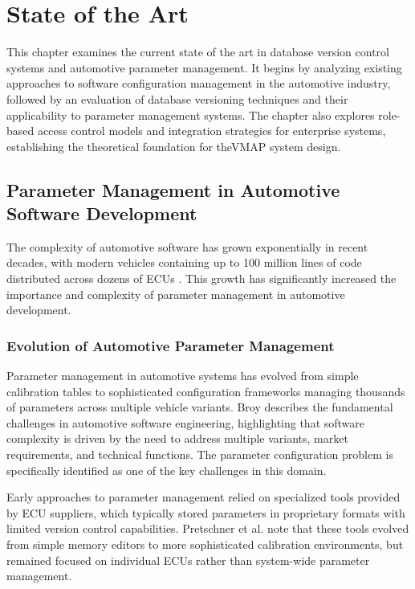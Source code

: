 \chapter{State of the Art}
\label{chap:state-of-art}

This chapter examines the current state of the art in database version control systems and automotive parameter management. It begins by analyzing existing approaches to software configuration management in the automotive industry, followed by an evaluation of database versioning techniques and their applicability to parameter management systems. The chapter also explores role-based access control models and integration strategies for enterprise systems, establishing the theoretical foundation for the\ac{VMAP} system design.

\section{Parameter Management in Automotive Software Development}
\label{sec:parameter-management}

The complexity of automotive software has grown exponentially in recent decades, with modern vehicles containing up to 100 million lines of code distributed across dozens of \acp{ECU} \cite{pretschner2007software}. This growth has significantly increased the importance and complexity of parameter management in automotive development.

\subsection{Evolution of Automotive Parameter Management}
\label{subsec:evolution-parameter-management}

Parameter management in automotive systems has evolved from simple calibration tables to sophisticated configuration frameworks managing thousands of parameters across multiple vehicle variants. Broy \cite{broy2006challenges} describes the fundamental challenges in automotive software engineering, highlighting that software complexity is driven by the need to address multiple variants, market requirements, and technical functions. The parameter configuration problem is specifically identified as one of the key challenges in this domain.

Early approaches to parameter management relied on specialized tools provided by \ac{ECU} suppliers, which typically stored parameters in proprietary formats with limited version control capabilities. Pretschner et al. \cite{pretschner2007software} note that these tools evolved from simple memory editors to more sophisticated calibration environments, but remained focused on individual \acp{ECU} rather than system-wide parameter management.

